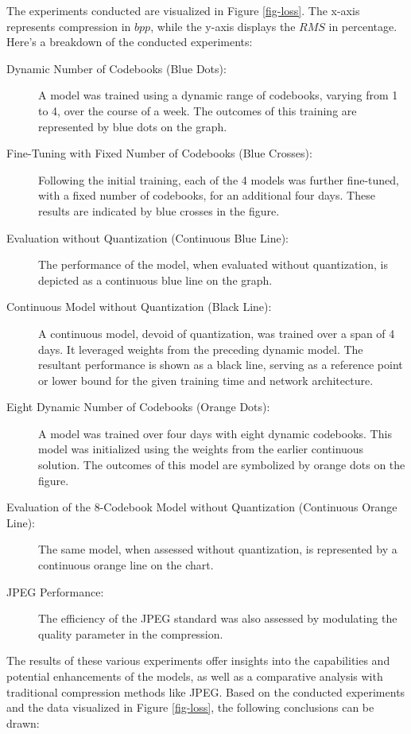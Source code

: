 \documentclass[runningheads]{llncs}
\begin{document}
The experiments conducted are visualized in Figure \ref{fig-loss}. The x-axis represents compression in $bpp$, while 
the y-axis displays the $RMS$ in percentage. Here's a breakdown of the conducted experiments: 
\begin{description}
\item[Dynamic Number of Codebooks (Blue Dots):] A model was trained using a dynamic range of 
codebooks, varying from 1 to 4, over the course of a week. The outcomes of this training are 
represented by blue dots on the graph.
\item[Fine-Tuning with Fixed Number of Codebooks (Blue Crosses):] Following the initial training, 
each of the 4 models was further fine-tuned, with a fixed number of codebooks, for an 
additional four days. These results are indicated by blue crosses in the figure. 
\item[Evaluation without Quantization (Continuous Blue Line):] The performance of the model, 
when evaluated without quantization, is depicted as a continuous blue line on the graph.
\item[Continuous Model without Quantization (Black Line):] A continuous model, devoid of 
quantization, was trained over a span of 4 days. It leveraged weights from the preceding 
dynamic model. The resultant performance is shown as a black line, serving as a reference 
point or lower bound for the given training time and network architecture.
\item[Eight Dynamic Number of Codebooks (Orange Dots):] A model was trained over four days with 
eight dynamic codebooks. This model was initialized using the weights from the earlier 
continuous solution. The outcomes of this model are symbolized by orange dots on the figure.
\item[Evaluation of the 8-Codebook Model without Quantization (Continuous Orange Line):] The 
same model, when assessed without quantization, is represented by a continuous orange line 
on the chart.
\item[JPEG Performance:] The efficiency of the JPEG standard was also assessed by modulating the 
quality parameter in the compression. 
\end{description}
 
The results of these various experiments offer insights into the capabilities and potential 
enhancements of the models, as well as a comparative analysis with traditional compression methods 
like JPEG.
Based on the conducted experiments and the data visualized in Figure \ref{fig-loss}, the following conclusions 
can be drawn: 
\end{document}
